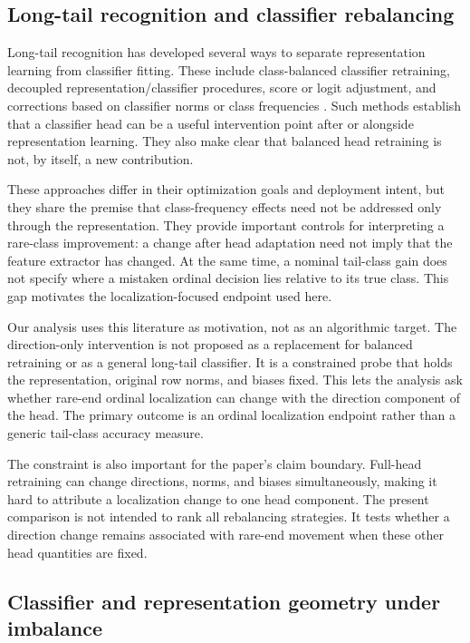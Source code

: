 \subsection{Long-tail recognition and classifier rebalancing}

Long-tail recognition has developed several ways to separate representation
learning from classifier fitting. These include class-balanced classifier
retraining, decoupled representation/classifier procedures, score or logit
adjustment, and corrections based on classifier norms or class frequencies
\cite{kang2020decoupling,alshammari2022weight,menon2021logit}. Such methods establish that a classifier head can be a useful
intervention point after or alongside representation learning. They also make
clear that balanced head retraining is not, by itself, a new contribution.

These approaches differ in their optimization goals and deployment intent, but
they share the premise that class-frequency effects need not be addressed only
through the representation. They provide important controls for interpreting a
rare-class improvement: a change after head adaptation need not imply that the
feature extractor has changed. At the same time, a nominal tail-class gain does
not specify where a mistaken ordinal decision lies relative to its true class.
This gap motivates the localization-focused endpoint used here.

Our analysis uses this literature as motivation, not as an algorithmic target.
The direction-only intervention is not proposed as a replacement for balanced
retraining or as a general long-tail classifier. It is a constrained probe that
holds the representation, original row norms, and biases fixed. This lets the
analysis ask whether rare-end ordinal localization can change with the
direction component of the head. The primary outcome is an ordinal localization
endpoint rather than a generic tail-class accuracy measure.

The constraint is also important for the paper's claim boundary. Full-head
retraining can change directions, norms, and biases simultaneously, making it
hard to attribute a localization change to one head component. The present
comparison is not intended to rank all rebalancing strategies. It tests whether
a direction change remains associated with rare-end movement when these other
head quantities are fixed.

\subsection{Classifier and representation geometry under imbalance}

